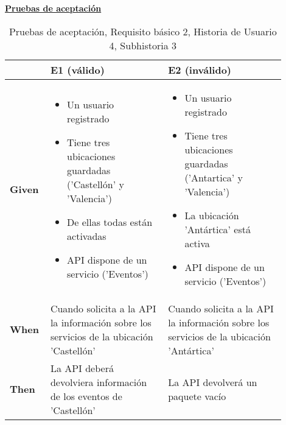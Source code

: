 \documentclass[../ei103948-project-documentation.tex]{subfiles}
\begin{document}
\begin{center}
						\textbf{\underline{Pruebas de aceptación}}
						\begin{table}[H]
							\centering
							\begin{tabular}{|p{0.10\linewidth}|p{0.40\linewidth}|p{0.40\linewidth}|}
								\hline
								\textbf{}      & \textbf{E1 (válido)}                                                                                                                                            & \textbf{E2 (inválido)}                                                                                                                                             \\ \hline
								\textbf{Given} &
								\begin{itemize}\vspace{-5mm}\setlength\itemsep{0mm}\setlength\parskip{0mm}\setlength{\itemindent}{-5mm} 
									\item Un usuario registrado
									\item Tiene tres ubicaciones guardadas ('Castellón' y 'Valencia')
									\item De ellas todas están activadas
									\item API dispone de un servicio ('Eventos')
								\end{itemize}& 
								\begin{itemize}\vspace{-5mm}\setlength\itemsep{0mm}\setlength\parskip{0mm}\setlength{\itemindent}{-5mm}
									\item Un usuario registrado
									\item Tiene tres ubicaciones guardadas ('Antartica' y 'Valencia')
									\item La ubicación 'Antártica' está activa
									\item API dispone de un servicio ('Eventos')
								\end{itemize}\\ \hline
								\textbf{When}  & Cuando solicita a la API la información sobre los servicios de la ubicación 'Castellón'                                                                         & Cuando solicita a la API la información sobre los servicios de la ubicación 'Antártica'                                                                            \\ \hline
								\textbf{Then}  & La API deberá devolviera información de los eventos de 'Castellón'                                                                                              & La API devolverá un paquete vacío                                                                                                                                  \\ \hline
								\end{tabular}
							\caption{Pruebas de aceptación, Requisito básico 2, Historia de Usuario 4, Subhistoria 3}
						\end{table}
						\end{center}
\end{document}
